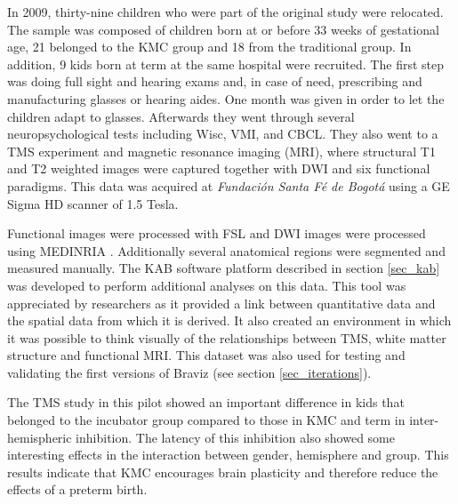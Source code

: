 In 2009, thirty-nine children who were part of the original study were relocated. The sample was composed of children born at or before 33 weeks of gestational age, 21 belonged to the KMC group and 18 from the traditional group. In addition, 9 kids born at term at the same hospital were recruited. 
The first step was doing full sight and hearing exams and, in case of need, prescribing and manufacturing glasses or hearing aides. One month was given in order to let the children adapt to glasses. Afterwards they went through several neuropsychological tests including Wisc, VMI, and CBCL. They also went to a TMS experiment and magnetic resonance imaging (MRI), where structural T1 and T2 weighted images were captured together with DWI and six functional paradigms. This data was acquired at \emph{Fundación Santa Fé de Bogotá} using a GE Sigma HD scanner of 1.5 Tesla. 






Functional images were processed with FSL and DWI images were processed using MEDINRIA \autocite{toussaint_medinria:_2007}. Additionally several anatomical regions were segmented and measured manually. The KAB software platform described in section \ref{sec_kab} was developed to perform additional analyses on this data. This tool was appreciated by researchers as it provided a link between quantitative data and the spatial data from which it is derived. It also created an environment in which it was possible to think visually of the relationships between TMS, white matter structure and functional MRI. This dataset was also used for testing and validating the first versions of Braviz (see section \ref{sec_iterations}).

The TMS study in this pilot showed an important difference in kids that belonged to the incubator group compared to those in KMC and term \autocite{schneider_cerebral_2012} in inter-hemispheric inhibition. The latency of this inhibition also showed some interesting effects in the interaction between gender, hemisphere and group. This results indicate that KMC encourages brain plasticity and therefore reduce the effects of a preterm birth. 


